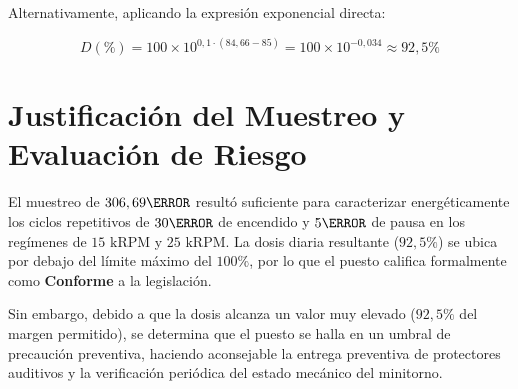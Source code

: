 Alternativamente, aplicando la expresión exponencial directa:

\begin{equation}
D(\%) = 100 \times 10^{0,1 \cdot (84,66 - 85)} = 100 \times 10^{-0,034} \approx 92,5\%
\end{equation}

\section{Justificación del Muestreo y Evaluación de Riesgo}
El muestreo de $306,69\s$ resultó suficiente para caracterizar energéticamente los ciclos repetitivos de $30\s$ de encendido y
$5\s$ de pausa en los regímenes de $15\text{ kRPM}$ y $25\text{ kRPM}$. La dosis diaria resultante ($92,5\%$) se ubica por
debajo del límite máximo del $100\%$, por lo que el puesto califica formalmente como \textbf{Conforme} a la legislación.

Sin embargo, debido a que la dosis alcanza un valor muy elevado ($92,5\%$ del margen permitido), se determina que el puesto
se halla en un umbral de precaución preventiva, haciendo aconsejable la entrega preventiva de protectores auditivos y la
verificación periódica del estado mecánico del minitorno.
